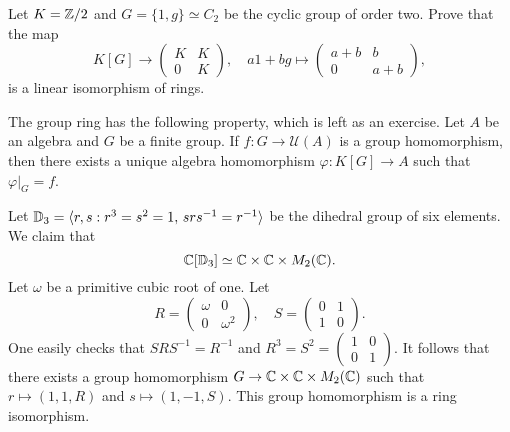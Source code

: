 \begin{exercise}
	Let $K=\mathbb{Z}/2$ and $G=\{1,g\}\simeq C_2$ be the cyclic group of order two. 
	Prove that the map 
 \[
 K[G]\to\begin{pmatrix}
		K&K\\
		0&K
	\end{pmatrix},\quad 
 a1+bg\mapsto\begin{pmatrix}
		a+b&b\\
		0&a+b		
	\end{pmatrix},
    \]
    is a linear isomorphism of rings.
\end{exercise}

The group ring has the following property, which is left as an exercise. 
Let $A$ be an algebra and
$G$ be a finite group. If $f\colon G\to\mathcal{U}(A)$ is a group homomorphism, 
then there exists a unique algebra homomorphism $\varphi\colon K[G]\to A$ such that
$\varphi|_G=f$. 

\begin{example}
	Let $\mathbb{D}_3=\langle r,s:r^3=s^2=1,\,srs^{-1}=r^{-1}\rangle$ be the dihedral
	group of six elements. We claim that 
	\[
	\mathbb{C}[\mathbb{D}_3]\simeq\mathbb{C}\times\mathbb{C}\times M_2(\mathbb{C}).
	\]
	Let $\omega$ be a primitive cubic root of one. Let 
	\[
	R=\begin{pmatrix}
		\omega&0\\
		0&\omega^2	
	\end{pmatrix},
	\quad
	S=\begin{pmatrix}
		0&1\\
		1&0
	\end{pmatrix}.
 	\]
 	One easily checks that $SRS^{-1}=R^{-1}$ and $R^3=S^2=\begin{pmatrix}
		1&0\\
		0&1	
	\end{pmatrix}$. It follows that there exists a group homomorphism
	$G\to\mathbb{C}\times\mathbb{C}\times M_2(\mathbb{C})$ such that
	$r\mapsto (1,1,R)$ and $s\mapsto (1,-1,S)$. This group homomorphism
	is a ring isomorphism.  
\end{example}




 